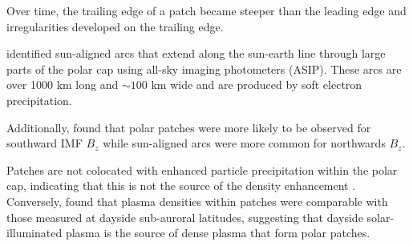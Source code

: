 

Over time, the trailing edge of a patch became steeper than the leading edge and irregularities developed on the trailing edge.

\citet{Weber1981} identified sun-aligned arcs that extend  along the sun-earth line through large parts of the polar cap using all-sky imaging photometers (ASIP).  These arcs are over 1000 km long and \(\sim100\) km wide and are produced by soft electron precipitation.  

Additionally, \citet{Buchau1983} found that polar patches were more likely to be observed for southward IMF \(B_z\) while sun-aligned arcs were more common for northwards \(B_z\).  



Patches are not colocated with enhanced particle precipitation within the polar cap, indicating that this is not the source of the density enhancement \citep{Weber1984}.  Conversely, \citet{Buchau1985} found that plasma densities within patches were comparable with those measured at dayside sub-auroral latitudes, suggesting that dayside solar-illuminated plasma is the source of dense plasma that form polar patches.

